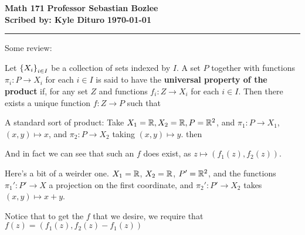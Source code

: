 \documentclass[12pt, twosided]{article}
\begin{document}
\noindent \textbf{Math 171} \hfill \textbf{Professor Sebastian Bozlee} \\
\textbf{Scribed by: Kyle Dituro} \hfill \textbf{\today}\hrule
\vspace{.2in}

Some review:

\begin{df}
  Let \(\left\{ X_i \right\}_{i \in I}\) be a collection of sets indexed by \(I\). A set \(P\) together with functions \(\pi_i: P \to X_i\) for each \(i \in I\) is said to have the \textbf{universal property of the product} if, for any set \(Z\) and functions \(f_i: Z \to X_i\) for each \(i \in I\). Then there exists a unique function \(f: Z \to P\) such that
  \begin{center}
  \end{center}
\end{df}

\begin{exa}
  A standard sort of product: Take \(X_1 = \mathbb{R}, X_2 = \mathbb{R}, P = \mathbb{R}^2\), and \(\pi_1: P \to X_1\), \((x, y) \mapsto x\), and \(\pi_2: P \to X_2\) taking \((x, y) \mapsto y\). then

  \begin{center}
  \end{center}
  And in fact we can see that such an \(f\) does exist, as \(z \mapsto (f_1(z), f_2(z))\).
\end{exa}

\begin{exa}
  Here's a bit of a weirder one.
  \(X_1 = \mathbb{R}\), \(X_2 = \mathbb{R}\), \(P\prime = \R^2\), and the functions \(\pi_1\prime: P\prime \to X\) a projection on the first coordinate, and \(\pi_2\prime: P\prime \to X_2\) takes \((x, y) \mapsto x + y\).

  \begin{center}
  \end{center}
  Notice that to get the \(f\) that we desire, we require that \(f(z) = (f_1(z), f_2(z) - f_1(z))\)
\end{exa}
\end{document}
